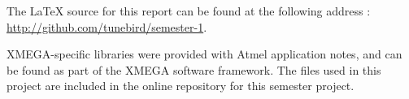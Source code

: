 The \LaTeX{} source for this report can be found at the following address :
\url{http://github.com/tunebird/semester-1}.

 XMEGA-specific libraries were provided with Atmel application notes, and can be
 found as part of the XMEGA software
 framework. The files used in this
 project are included in the online repository for this semester project.



%
%
%
%
%
%
%
%
%
%
%
%
